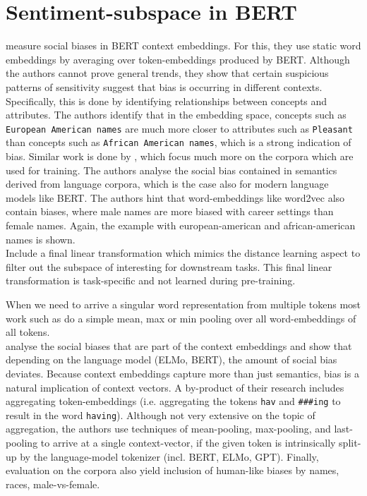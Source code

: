 \documentclass[a4paper,12pt,twoside,openright]{report}
\begin{document}
\section{Sentiment-subspace in BERT}

\cite{may19} measure social biases in BERT context embeddings.
For this, they use static word embeddings by averaging over token-embeddings produced by BERT.
Although the authors cannot prove general trends, they show that certain suspicious patterns of sensitivity suggest that bias is occurring in different contexts.
Specifically, this is done by identifying relationships between concepts and attributes. 
The authors identify that in the embedding space, concepts such as \texttt{European American names} are much more closer to attributes such as \texttt{Pleasant} than concepts such as \texttt{African American names}, which is a strong indication of bias.
Similar work is done by \cite{caliskan19}, which focus much more on the corpora which are used for training.
The authors analyse the social bias contained in semantics derived from language corpora, which is the case also for modern language models like BERT.
The authors hint that word-embeddings like word2vec also contain biases, where male names are more biased with career settings than female names.
Again, the example with european-american and african-american names is shown. \\

\cite{moradshahi19} Include a final linear transformation which mimics the distance learning aspect to filter out the subspace of interesting for downstream tasks.
This final linear transformation is task-specific and not learned during pre-training.

When we need to arrive a singular word representation from multiple tokens most work such as \cite{bommasani19, akbik19} do a simple mean, max or min pooling over all word-embeddings of all tokens. \\


\cite{may19} analyse the social biases that are part of the context embeddings and show that depending on the language model (ELMo, BERT), the amount of social bias deviates. 
Because context embeddings capture more than just semantics, bias is a natural implication of context vectors.
A by-product of their research includes aggregating token-embeddings (i.e. aggregating the tokens \texttt{hav} and \texttt{\#\#\#ing} to result in the word \texttt{having}).
Although not very extensive on the topic of aggregation, the authors use techniques of mean-pooling, max-pooling, and last-pooling to arrive at a single context-vector, if the given token is intrinsically split-up by the language-model tokenizer (incl. BERT, ELMo, GPT).
Finally, evaluation on the corpora also yield inclusion of human-like biases \cite{jentzsch19} by names, races, male-vs-female. \\
\end{document}
